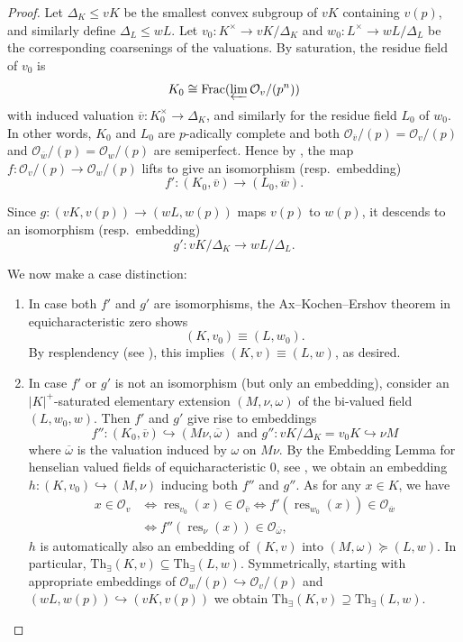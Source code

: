 \documentclass[10pt,a4paper]{amsart}
\renewcommand{\O}{\mathcal{O}}
\DeclareMathOperator{\res}{res}
\begin{document}
\begin{proof}
        Let $\Delta_K\leq vK$ be the smallest convex subgroup of $vK$ containing $v(p)$, and similarly define $\Delta_L\leq wL$.
        Let $v_0\colon K^\times\to vK / \Delta_K$ and $w_0\colon L^\times\to wL / \Delta_L$ be the corresponding coarsenings of the valuations.
        By saturation, the residue field of $v_0$ is 
        \[K_0\cong \mathrm{Frac}(\varprojlim \O_v/(p^n))\]
        with induced valuation $\overline{v}\colon K_0^\times\to \Delta_K$, and similarly for the residue field $L_0$ of $w_0$.
        In other words, $K_0$ and $L_0$ are $p$-adically complete and both $\O_{\overline{v}}/(p) = \O_v/(p)$ and $\O_{\overline{w}}/(p) = \O_w/(p)$
         are  semiperfect.
        Hence by , the map $f\colon \O_v/(p)\to \O_w/(p)$ lifts to give an isomorphism (resp.\ embedding)
        \[
        f'\colon (K_0, \overline{v})\to (L_0, \overline{w}).
        \]

        Since $g\colon (vK, v(p))\to (wL, w(p))$ maps $v(p)$ to $w(p)$, it descends to an isomorphism (resp.\ embedding)
        \[
        g'\colon vK/\Delta_K\to wL /\Delta_L. 
        \]

        We now make a case distinction:
        \begin{enumerate}
        \item In case both $f'$ and $g'$ are isomorphisms, the 
        Ax--Kochen--Ershov theorem in equicharacteristic zero shows 
        \[
         (K,v_0)\equiv (L, w_0).
        \]
        By resplendency (see \cite[Proposition 2.3]{ketelsenCompositionAxKochenErshov2026}), this implies 
        $(K,v)\equiv (L,w)$, as desired.
        
        \item In case $f'$ or $g'$ is not an isomorphism (but only an embedding), consider an $|K|^+$-saturated elementary extension $(M,\nu, \omega)$
        of the bi-valued field $(L,w_0,w)$. Then $f'$ and $g'$ give rise to embeddings
        $$f'' \colon (K_0,\overline{v}) \hookrightarrow (M\nu, \overline{\omega})
        \textrm{ and } g'' \colon vK/\Delta_K = v_0K \hookrightarrow \nu M$$
        where $\overline{\omega}$ is the valuation induced by \(\omega\) on $M\nu$.
        By the Embedding Lemma for henselian valued fields of equicharacteristic $0$, see \cite[Lemma 4.6.2]{PD}, we obtain an embedding $h: (K,v_0) \hookrightarrow (M,\nu)$ inducing both $f''$ and $g''$. As for any $x \in K$, we have
        \begin{align*}
        x \in \O_v &\Longleftrightarrow {\res}_{v_0}(x) \in \O_{\overline{v}} \Longleftrightarrow f'(\res_{w_0}(x)) \in \O_{\overline{w}} \\ & \Longleftrightarrow f''(\res_\nu (x)) \in \O_{\overline{\omega}} ,
        \end{align*}
        $h$ is automatically also an embedding of $(K,v)$ into $(M,\omega) \succeq (L,w)$. In particular, $\mathrm{Th}_\exists(K,v) \subseteq \mathrm{Th}_\exists(L,w)$.
        Symmetrically, starting with appropriate 
        embeddings of $\O_w/(p) \hookrightarrow \O_v/(p)$
        and $(wL,w(p)) \hookrightarrow (vK,v(p))$ we obtain $\mathrm{Th}_\exists(K,v) \supseteq \mathrm{Th}_\exists(L,w)$.
        \end{enumerate}


\end{proof}
\end{document}
